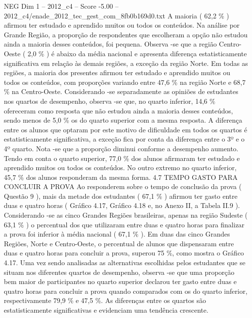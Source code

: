 \begin{textsample}{NEG Dim 1 – 2012\_c4 – Score -5.00 – 2012\_c4/enade\_2012\_tec\_gest\_com\_8fb0b169d0.txt}
A maioria ( 62,2 \% ) afirmou ter estudado e aprendido muitos ou todos os conteúdos.
Na análise por Grande Região, a proporção de respondentes que escolheram a opção não estudou ainda a maioria desses conteúdos, foi pequena.
Observa -se que a região Centro-Oeste ( 2,0 \% ) é abaixo da média nacional e apresenta diferença estatisticamente significativa em relação às demais regiões, a exceção da região Norte.
Em todas as regiões, a maioria dos presentes afirmou ter estudado e aprendido muitos ou todos os conteúdos, com proporções variando entre 47,6 \% na região Norte e 68,7 \% na Centro-Oeste.
Considerando -se separadamente as opiniões de estudantes nos quartos de desempenho, observa -se que, no quarto inferior, 14,6 \% ofereceram como resposta que não estudou ainda a maioria desses conteúdos, sendo menos de 5,0 \% os do quarto superior com a mesma resposta.
A diferença entre os alunos que optaram por este motivo de dificuldade em todos os quartos é estatisticamente significativa, a exceção fica por conta da diferença entre o 3º e o 4º quarto.
Nota -se que a proporção diminui conforme a desempenho aumento.
Tendo em conta o quarto superior, 77,0 \% dos alunos afirmaram ter estudado e aprendido muitos ou todos os conteúdos.
No outro extremo no quarto inferior, 45,7 \% dos alunos responderam da mesma forma. 4.7 TEMPO GASTO PARA CONCLUIR A PROVA Ao responderem sobre o tempo de conclusão da prova ( Questão 9 ), mais da metade dos estudantes ( 67,1 \% ) afirmou ter gasto entre duas e quatro horas ( Gráfico 4.17, Gráfico 4.18 e, no Anexo II, a Tabela II.9 ).
Considerando -se as cinco Grandes Regiões brasileiras, apenas na região Sudeste ( 63,1 \% ) o percentual dos que utilizaram entre duas e quatro horas para finalizar a prova foi inferior à média nacional ( 67,1 \% ).
Em duas das cinco Grandes Regiões, Norte e Centro-Oeste, o percentual de alunos que dispensaram entre duas e quatro horas para concluir a prova, superou 75 \%, como mostra o Gráfico 4.17.
Uma vez sendo analisadas as alternativas escolhidas pelos estudantes que se situam nos diferentes quartos de desempenho, observa -se que uma proporção bem maior de participantes no quarto superior declarou ter gasto entre duas e quatro horas para concluir a prova quando comparados com os do quarto inferior, respectivamente 79,9 \% e 47,5 \%.
As diferenças entre os quartos são estatisticamente significativas e evidenciam uma tendência crescente.

\end{textsample}
